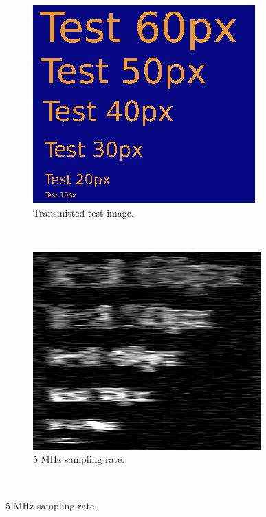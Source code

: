 \documentclass[a4paper,12pt,twoside,openright]{report}
\begin{document}
\begin{figure}[h!]
\centering
\begin{subfigure}[t]{0.3\textwidth}
  \includegraphics[width=\textwidth]{sup_res_test}
  \caption{Transmitted test image.}
\end{subfigure} ~
\begin{subfigure}[t]{0.3\textwidth}
  \includegraphics[width=\textwidth]{sup_res_off}
  \caption{5 MHz sampling rate.}
\end{subfigure} ~

\end{figure}
\end{document}
